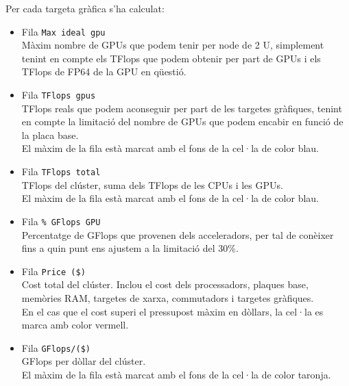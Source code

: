 Per cada targeta gràfica s'ha calculat:
\begin{itemize}
    \item Fila \texttt{Max ideal gpu}\\
        Màxim nombre de GPUs que podem tenir per node de 2 U, simplement tenint en compte els TFlops que podem obtenir per part de GPUs i els TFlops de FP64 de la GPU en qüestió.

    \item Fila \texttt{TFlops gpus}\\
        TFlops reals que podem aconseguir per part de les targetes gràfiques, tenint en compte la limitació del nombre de GPUs que podem encabir en funció de la placa base.\\
        El màxim de la fila està marcat amb el fons de la cel·la de color blau.
        
    \item Fila \texttt{TFlops total}\\
        TFlops del clúster, suma dels TFlops de les CPUs i les GPUs. \\
        El màxim de la fila està marcat amb el fons de la cel·la de color blau.

    \item Fila \texttt{\% GFlops GPU}\\
        Percentatge de GFlops que provenen dels acceleradors, per tal de conèixer fins a quin punt ens ajustem a la limitació del 30\%.

    \item Fila \texttt{Price (\$)}\\
        Cost total del clúster. Inclou el cost dels processadors, plaques base, memòries RAM, targetes de xarxa, commutadors i targetes gràfiques. \\
        En el cas que el cost superi el pressupost màxim en dòllars, la cel·la es marca amb color vermell.

    \item Fila \texttt{GFlops/(\$)}\\
        GFlops per dòllar del clúster.\\
        El màxim de la fila està marcat amb el fons de la cel·la de color taronja.
\end{itemize}
